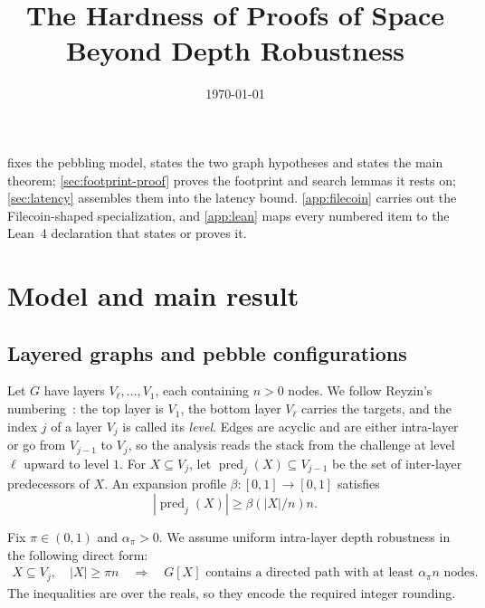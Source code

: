 \documentclass[11pt]{article}
\title{The Hardness of Proofs of Space Beyond Depth Robustness}
\author{ }
\date{\today}
\theoremstyle{plain}
\theoremstyle{remark}
\begin{document}
\maketitle

 fixes the pebbling model, states the two graph hypotheses and states
the main theorem; \cref{sec:footprint-proof} proves the footprint and search lemmas it
rests on; \cref{sec:latency} assembles them into the latency bound.
\cref{app:filecoin} carries out the Filecoin-shaped specialization, and
\cref{app:lean} maps every numbered item to the Lean~4 declaration that states or proves
it.

\section{Model and main result}
\label{sec:model}
\subsection{Layered graphs and pebble configurations}

Let \(G\) have layers \(V_\ell,\ldots,V_1\), each containing \(n>0\)
nodes.  We follow Reyzin's numbering~\cite{FOCS:Reyzin24}: the top layer is
\(V_1\), the bottom layer \(V_\ell\) carries the targets, and the index \(j\) of a
layer \(V_j\) is called its \emph{level}.  Edges are acyclic and are either
intra-layer or go from \(V_{j-1}\) to \(V_j\), so the analysis reads the stack from
the challenge at level \(\ell\) upward to level \(1\).  For \(X\subseteq V_j\), let
\(\operatorname{pred}_j(X)\subseteq V_{j-1}\) be the set of inter-layer predecessors
of \(X\).  An expansion profile \(\beta:[0,1]\to[0,1]\) satisfies
\begin{equation}
 |\operatorname{pred}_j(X)|\ge
 \beta(|X|/n)n .
 \label{eq:expansion}
\end{equation}

Fix \(\pi\in(0,1)\) and \(\alpha_\pi>0\).  We assume uniform intra-layer
depth robustness in the following direct form:
\begin{equation}
 \begin{split}
  X\subseteq V_j,\quad |X|\ge\pi n
  \quad\Longrightarrow\quad
  G[X]\text{ contains a directed path with at least }\alpha_\pi n
  \text{ nodes}.
 \end{split}
 \label{eq:depth-robust}
\end{equation}
The inequalities are over the reals, so they encode the required integer rounding.
\end{document}
